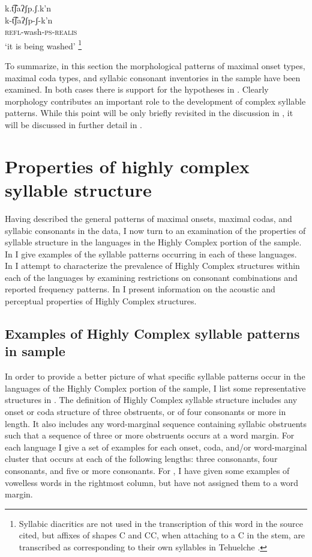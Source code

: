 \ea\label{ex:3.26}

\glll k.t͡ʃaʔʃp.ʃ.k’n\\
k-t͡ʃaʔʃp-ʃ-k’n\\
\textsc{refl}-wash-\textsc{ps-realis}\\
\glt ‘it is being washed’ \citep[13]{FernándezGarayHernández2006}\footnote{Syllabic diacritics are not used in the transcription of this word in the source cited, but affixes of shapes C and CC, when attaching to a C in the stem, are transcribed as corresponding to their own syllables in Tehuelche \citep[101--102]{FernándezGaray1998}.}
\z

  To summarize, in this section the morphological patterns of maximal onset types, maximal coda types, and syllabic consonant inventories in the sample have been examined. In both cases there is support for the hypotheses in . Clearly morphology contributes an important role to the development of complex syllable patterns. While this point will be only briefly revisited in the discussion in , it will be discussed in further detail in .

\section{Properties of highly complex syllable structure}\label{sec:3.4}

  Having described the general patterns of maximal onsets, maximal codas, and syllabic consonants in the data, I now turn to an examination of the properties of syllable structure in the languages in the Highly Complex portion of the sample. In  I give examples of the syllable patterns occurring in each of these languages. In  I attempt to characterize the prevalence of Highly Complex structures within each of the languages by examining restrictions on consonant combinations and reported frequency patterns. In  I present information on the acoustic and perceptual properties of Highly Complex structures.

\subsection{Examples of Highly Complex syllable patterns in sample}\label{sec:3.4.1}

  In order to provide a better picture of what specific syllable patterns occur in the languages of the Highly Complex portion of the sample, I list some representative structures in . The definition of Highly Complex syllable structure includes any onset or coda structure of three obstruents, or of four consonants or more in length. It also includes any word-marginal sequence containing syllabic obstruents such that a sequence of three or more obstruents occurs at a word margin. For each language I give a set of examples for each onset, coda, and/or word-marginal cluster that occurs at each of the following lengths: three consonants, four consonants, and five or more consonants. For , I have given some examples of vowelless words in the rightmost column, but have not assigned them to a word margin.

